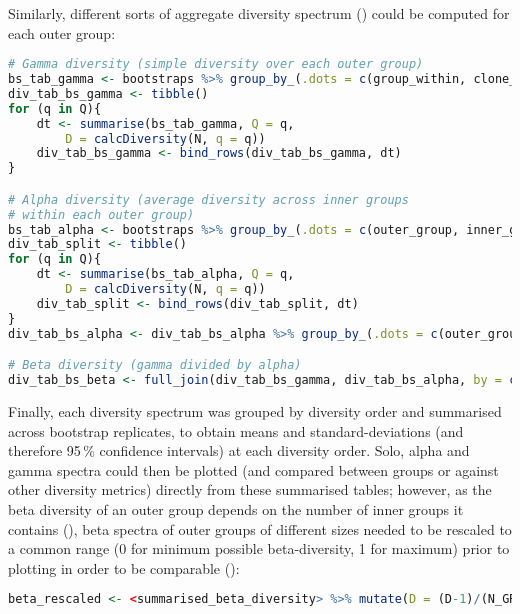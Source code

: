 \noindent Similarly, different sorts of aggregate diversity spectrum () could be computed for each outer group:

\begin{lstlisting}[language=R]
# Gamma diversity (simple diversity over each outer group)
bs_tab_gamma <- bootstraps %>% group_by_(.dots = c(group_within, clone_field, "ITER")) %>% summarise(N = sum(N)) %>% group_by_(.dots = c(outer_group, "ITER"))
div_tab_bs_gamma <- tibble()
for (q in Q){
	dt <- summarise(bs_tab_gamma, Q = q,
		D = calcDiversity(N, q = q))
	div_tab_bs_gamma <- bind_rows(div_tab_bs_gamma, dt)
}

# Alpha diversity (average diversity across inner groups
# within each outer group)
bs_tab_alpha <- bootstraps %>% group_by_(.dots = c(outer_group, inner_group, "ITER"))
div_tab_split <- tibble()
for (q in Q){
	dt <- summarise(bs_tab_alpha, Q = q,
		D = calcDiversity(N, q = q))
	div_tab_split <- bind_rows(div_tab_split, dt)
}
div_tab_bs_alpha <- div_tab_bs_alpha %>% group_by_(.dots = c(outer_group, "ITER", "Q")) %>% summarise(D = ifelse(dplyr::first(Q) != 1, mean(D^(1-dplyr::first(Q)))^(1/(1-dplyr::first(Q))),  exp(mean(log(D)))), N_GROUP = n())

# Beta diversity (gamma divided by alpha)
div_tab_bs_beta <- full_join(div_tab_bs_gamma, div_tab_bs_alpha, by = c(outer_group, "ITER", "Q"), suffix = c("_GAMMA", "_ALPHA")) %>% mutate(D= D_GAMMA/D_ALPHA) %>% select(-D_GAMMA, -D_ALPHA)
\end{lstlisting}

\noindent Finally, each diversity spectrum was grouped by diversity order and summarised across bootstrap replicates, to obtain means and standard-deviations (and therefore 95\,\% confidence intervals) at each diversity order. Solo, alpha and gamma spectra could then be plotted (and compared between groups or against other diversity metrics) directly from these summarised tables; however, as the beta diversity of an outer group depends on the number of inner groups it contains (), beta spectra of outer groups of different sizes needed to be rescaled to a common range (0 for minimum possible beta-diversity, 1 for maximum) prior to plotting in order to be comparable ():

\begin{lstlisting}[language=R]
beta_rescaled <- <summarised_beta_diversity> %>% mutate(D = (D-1)/(N_GROUP-1), D_UPPER = (D_UPPER-1)/(N_GROUP-1), D_LOWER = (D_LOWER-1)/(N_GROUP-1), D_SD = D_SD/(N_GROUP-1)) %>% select(-N_GROUP)
\end{lstlisting}

